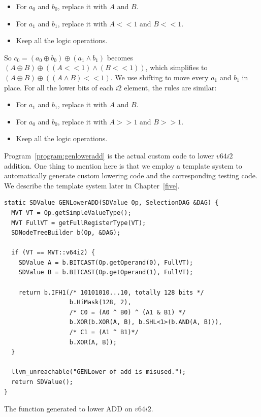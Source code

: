\begin{itemize}
    \item For $a_0$ and $b_0$, replace it with $A$ and $B$.
    \item For $a_1$ and $b_1$, replace it with $A << 1$ and $B << 1$.
    \item Keep all the logic operations.
\end{itemize}

So $c_0 = (a_0 \oplus b_0) \oplus (a_1 \land b_1)$ becomes $(A \oplus B) \oplus ((A << 1) \land (B << 1))$, which simplifies to $(A \oplus B) \oplus ((A \land B) << 1)$. We use shifting to move every $a_1$ and $b_1$ in place. For all the lower bits of each $i2$ element, the rules are similar:

\begin{itemize}
    \item For $a_1$ and $b_1$, replace it with $A$ and $B$.
    \item For $a_0$ and $b_0$, replace it with $A >> 1$ and $B >> 1$.
    \item Keep all the logic operations.
\end{itemize}

Program~\ref{program:genloweradd} is the actual custom code to lower $v64i2$ addition. One thing to mention here is that we employ a template system to automatically generate custom lowering code and the corresponding testing code. We describe the template system later in Chapter~\ref{five}.

\begin{program}
\begin{verbatim}
static SDValue GENLowerADD(SDValue Op, SelectionDAG &DAG) {
  MVT VT = Op.getSimpleValueType();
  MVT FullVT = getFullRegisterType(VT);
  SDNodeTreeBuilder b(Op, &DAG);

  if (VT == MVT::v64i2) {
    SDValue A = b.BITCAST(Op.getOperand(0), FullVT);
    SDValue B = b.BITCAST(Op.getOperand(1), FullVT);

    return b.IFH1(/* 10101010...10, totally 128 bits */
                  b.HiMask(128, 2),
                  /* C0 = (A0 ^ B0) ^ (A1 & B1) */
                  b.XOR(b.XOR(A, B), b.SHL<1>(b.AND(A, B))),
                  /* C1 = (A1 ^ B1)*/
                  b.XOR(A, B));
  }

  llvm_unreachable("GENLower of add is misused.");
  return SDValue();
}
\end{verbatim}
\caption{The function generated to lower ADD on $v64i2$.}
\label{program:genloweradd}
\end{program}

